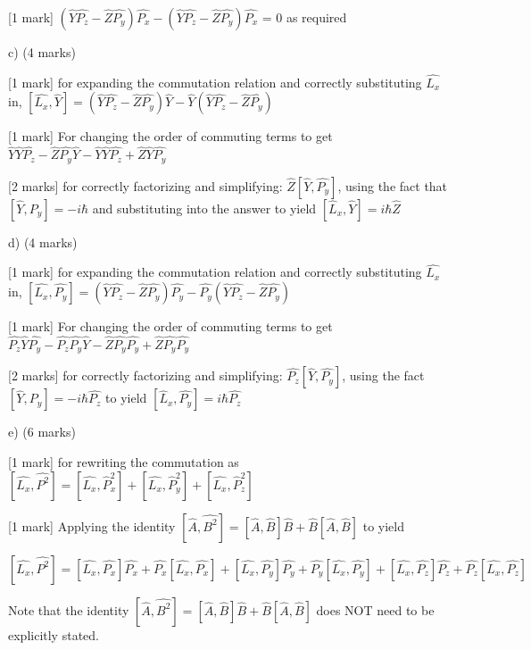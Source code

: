 \documentclass[a4paper,11pt]{article}
\begin{document}
[1 mark] \((\hat{Y}\hat{P_{z}} - \hat{Z}\hat{P_{y}})\hat{P_{x}}  - (\hat{Y}\hat{P_{z}} - \hat{Z}\hat{P_{y}})\hat{P_{x}}\)  = 0 as required

c)  (4 marks)

[1 mark] for expanding the commutation relation and correctly substituting \( \hat{L_{x}} \) in, \([\hat{L_{x}}, \hat{Y}] = (\hat{Y}\hat{P_{z}} - \hat{Z}\hat{P_{y}})\hat{Y} - \hat{Y}(\hat{Y}\hat{P_{z}} - \hat{Z}\hat{P_{y}})\)

[1 mark] For changing the order of commuting terms to get \( \hat{Y}\hat{Y}\hat{P_{z}} - \hat{Z}\hat{P_{y}}\hat{Y} - \hat{Y}\hat{Y}\hat{P_{z}} + \hat{Z}\hat{Y}\hat{P_{y}} \)

[2 marks] for correctly factorizing and simplifying: \( \hat{Z}[\hat{Y}, \hat{P_{y}}] \), using the fact that \( [\hat{Y}, \hat{P_{y}}] = -i\hbar \) and substituting into the answer to yield \( [\hat{L}_x, \hat{Y}] = i\hbar \hat{Z} \)

d) (4 marks)

[1 mark] for expanding the commutation relation and correctly substituting \( \hat{L_{x}} \) in, \([\hat{L_{x}}, \hat{P_{y}}] = (\hat{Y}\hat{P_{z}} - \hat{Z}\hat{P_{y}})\hat{P_{y}} - \hat{P_{y}}(\hat{Y}\hat{P_{z}} - \hat{Z}\hat{P_{y}})\)

[1 mark] For changing the order of commuting terms to get \( \hat{P_{z}}\hat{Y}\hat{P_{y}} - \hat{P_{z}}\hat{P_{y}}\hat{Y} - \hat{Z}\hat{P_{y}}\hat{P_{y}} + \hat{Z}\hat{P_{y}}\hat{P_{y}} \)

[2 marks] for correctly factorizing and simplifying: \( \hat{P_{z}}[\hat{Y}, \hat{P_{y}}] \), using the fact \( [\hat{Y}, \hat{P_{y}}] = -i\hbar \hat{P_{z}} \) to yield \( [\hat{L}_x, \hat{P_{y}}] = i\hbar\hat{P_{z}} \)

e) (6 marks)

[1 mark] for rewriting the commutation as \( [\hat{L_{x}}, \hat{P^{2}}] = [\hat{L_{x}}, \hat{P}_{x}^{2} ] + [\hat{L_{x}}, \hat{P}_{y}^{2}] + [\hat{L_{x}}, \hat{P}_{z}^{2}] \)

[1 mark] Applying the identity \( [\hat{A}, \hat{B^{2}}] = [\hat{A}, \hat{B}]\hat{B} + \hat{B}[\hat{A},\hat{B}] \) to yield 

\[ [\hat{L_{x}}, \hat{P^{2}}] = [\hat{L_{x}}, \hat{P_{x}}]\hat{P_{x}} + \hat{P_{x}}[\hat{L_x}, \hat{P_{x}}] + [\hat{L_{x}}, \hat{P_{y}}]\hat{P_{y}} + \hat{P_{y}}[\hat{L_{x}}, \hat{P_{y}}] + [\hat{L_{x}}, \hat{P_{z}}]\hat{P_{z}} + \hat{P_{z}}[\hat{L_{x}}, \hat{P_{z}}] \]

Note that the identity \( [\hat{A}, \hat{B^{2}}] = [\hat{A}, \hat{B}]\hat{B} + \hat{B}[\hat{A},\hat{B}] \) does NOT need to be explicitly stated.
\end{document}
